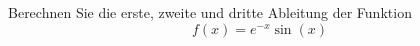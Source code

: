 \begin{ExerciseBlock}
Berechnen Sie die erste, zweite und dritte Ableitung der Funktion 
\begin{equation*}
	f(x)= e^{-x} \sin(x)
\end{equation*}

\end{ExerciseBlock}
